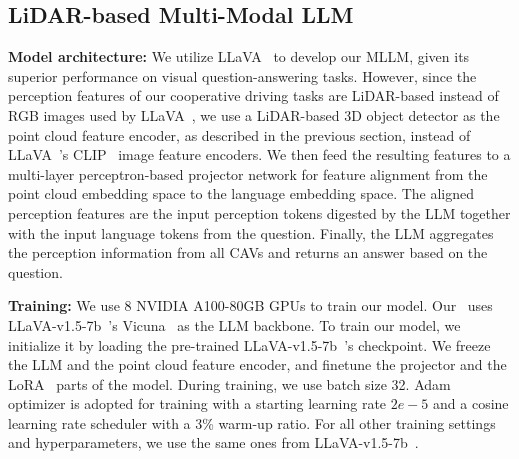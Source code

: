 \subsection{LiDAR-based Multi-Modal LLM}
\noindent\textbf{Model architecture:} We utilize LLaVA~\cite{liu2023llava} to develop our MLLM, given its superior performance on visual question-answering tasks. However, since the perception features of our cooperative driving tasks are LiDAR-based instead of RGB images used by LLaVA~\cite{liu2023llava}, we use a LiDAR-based 3D object detector as the point cloud feature encoder, as described in the previous section, instead of LLaVA~\cite{liu2023llava}'s CLIP~\cite{radford2021clip} image feature encoders.
We then feed the resulting features to a multi-layer perceptron-based projector network for feature alignment from the point cloud embedding space to the language embedding space. The aligned perception features are the input perception tokens digested by the LLM together with the input language tokens from the question. Finally, the LLM aggregates the perception information from all CAVs and returns an answer based on the question. 

\noindent\textbf{Training:} We use 8 NVIDIA A100-80GB GPUs to train our model. Our \namemethod~uses LLaVA-v1.5-7b~\cite{liu2023llava}'s Vicuna~\cite{chiang2023vicuna} as the LLM backbone. To train our model, we initialize it by loading the pre-trained LLaVA-v1.5-7b~\cite{liu2023llava}'s checkpoint. We freeze the LLM and the point cloud feature encoder, and finetune the projector and the LoRA~\cite{hu2022lora} parts of the model. During training, we use batch size 32. Adam optimizer is adopted for training with a starting learning rate $2e-5$ and a cosine learning rate scheduler with a 3\% warm-up ratio. For all other training settings and hyperparameters, we use the same ones from LLaVA-v1.5-7b~\cite{liu2023llava}.





   